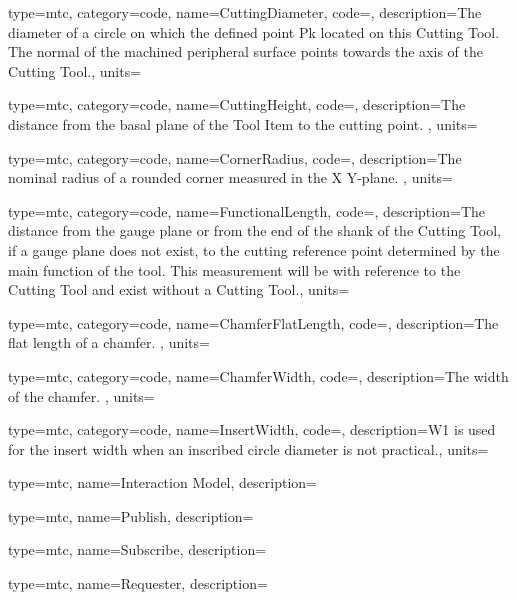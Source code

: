 {
  type=mtc,
  category=code,
  name={CuttingDiameter},
  code=,
  description={The diameter of a circle on which the defined point Pk located on this Cutting Tool. The normal of the machined peripheral surface points towards the axis of the Cutting Tool.},
  units=
}


{
  type=mtc,
  category=code,
  name={CuttingHeight},
  code=,
  description={The distance from the basal plane of the Tool Item to the cutting point. },
  units=
}


{
  type=mtc,
  category=code,
  name={CornerRadius},
  code=,
  description={The nominal radius of a rounded corner measured in the X Y-plane. },
  units=
}


{
  type=mtc,
  category=code,
  name={FunctionalLength},
  code=,
  description={The distance from the gauge plane or from the end of the shank of the Cutting Tool, if a gauge plane does not exist, to the cutting reference point determined by the main function of the tool. This measurement will be with reference to the Cutting Tool and \MUSTNOT exist without a Cutting Tool.},
  units=
}


{
  type=mtc,
  category=code,
  name={ChamferFlatLength},
  code=,
  description={The flat length of a chamfer. },
  units=
}


{
  type=mtc,
  category=code,
  name={ChamferWidth},
  code=,
  description={The width of the chamfer. },
  units=
}


{
  type=mtc,
  category=code,
  name={InsertWidth},
  code=,
  description={W1 is used for the insert width when an inscribed circle diameter is not practical.},
  units=
}


{
  type=mtc,
  name={Interaction Model},
  description={}
}


{
  type=mtc,
  name={Publish},
  description={}
}


{
  type=mtc,
  name={Subscribe},
  description={}
}


{
  type=mtc,
  name={Requester},
  description={}
}


